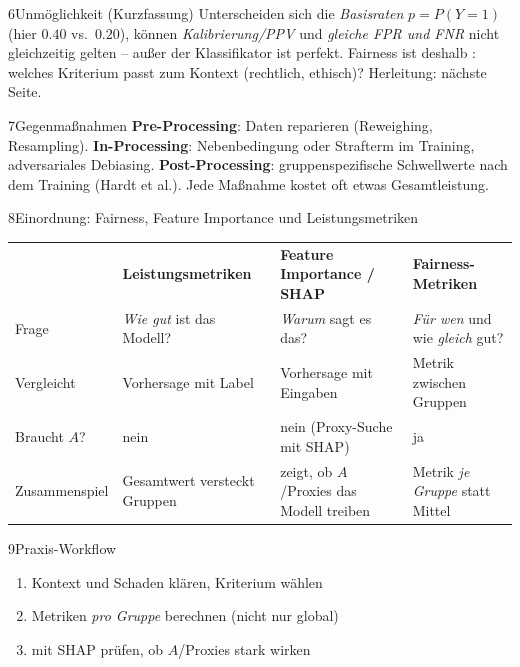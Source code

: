 \begin{hngrid}
%
\begin{hnp}[raster multicolumn=3,acc=hnrose]{6}{Unmöglichkeit (Kurzfassung)}
Unterscheiden sich die \emph{Basisraten} $p=P(Y{=}1)$ (hier $0.40$ vs.\ $0.20$), können \emph{Kalibrierung/PPV} und \emph{gleiche FPR und FNR} nicht gleichzeitig gelten -- außer der Klassifikator ist perfekt. Fairness ist deshalb : welches Kriterium passt zum Kontext (rechtlich, ethisch)? Herleitung: nächste Seite.
\end{hnp}
%
\begin{hnp}[raster multicolumn=3,acc=hnpurple]{7}{Gegenmaßnahmen}
\textbf{Pre-Processing}: Daten reparieren (Reweighing, Resampling). \textbf{In-Processing}: Nebenbedingung oder Strafterm im Training, adversariales Debiasing. \textbf{Post-Processing}: gruppenspezifische Schwellwerte nach dem Training (Hardt et al.). Jede Maßnahme kostet oft etwas Gesamtleistung.
\end{hnp}
%
\begin{hnp}[raster multicolumn=6,acc=hnteal]{8}{Einordnung: Fairness, Feature Importance und Leistungsmetriken}
\setlength{\tabcolsep}{2.4pt}\renewcommand{\arraystretch}{1.3}\fontsize{\hntabsz}{\hntablead}\selectfont
\begin{tabular}{@{}>{\raggedright\arraybackslash}p{2.4cm}>{\raggedright\arraybackslash}p{3.6cm}>{\raggedright\arraybackslash}p{3.5cm}>{\raggedright\arraybackslash}p{3.6cm}@{}}
\rowcolor{hnteal!12}&\textbf{Leistungsmetriken}&\textbf{Feature Importance / SHAP}&\textbf{Fairness-Metriken}\\
Frage&\emph{Wie gut} ist das Modell?&\emph{Warum} sagt es das?&\emph{Für wen} und wie \emph{gleich} gut?\\
Vergleicht&Vorhersage mit Label&Vorhersage mit Eingaben&Metrik zwischen Gruppen\\
Braucht $A$?&nein&nein (Proxy-Suche mit SHAP)&ja\\
Zusammenspiel&Gesamtwert versteckt Gruppen&zeigt, ob $A$/Proxies das Modell treiben&Metrik \emph{je Gruppe} statt Mittel\\
\end{tabular}
\end{hnp}
%
\begin{hnp}[raster multicolumn=3,acc=hngreen]{9}{Praxis-Workflow}
\begin{enumerate}
\item Kontext und Schaden klären, Kriterium wählen
\item Metriken \emph{pro Gruppe} berechnen (nicht nur global)
\item mit SHAP prüfen, ob $A$/Proxies stark wirken

\end{enumerate}
\end{hnp}
\end{hngrid}
